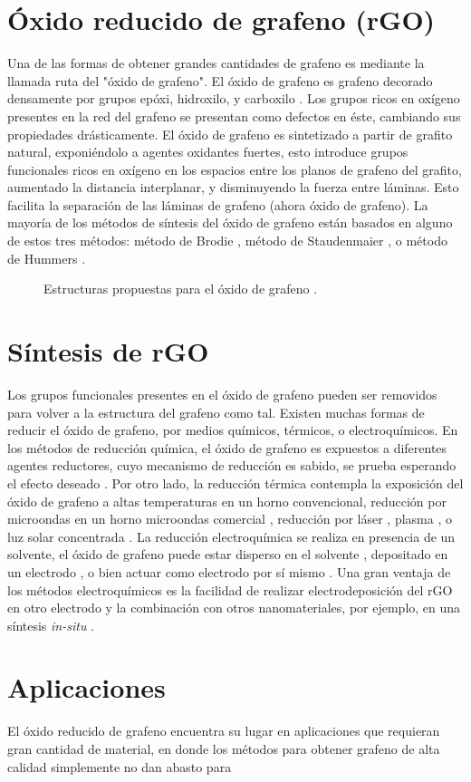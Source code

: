 \section{Óxido reducido de grafeno (rGO)}
Una de las formas de obtener grandes cantidades de grafeno es mediante la llamada ruta del "óxido de grafeno". El óxido de grafeno es grafeno decorado densamente por grupos epóxi, hidroxilo, y carboxilo \citep{Dreyer2010}. Los grupos ricos en oxígeno presentes en la red del grafeno se presentan como defectos en éste, cambiando sus propiedades drásticamente.
El óxido de grafeno es sintetizado a partir de grafito natural, exponiéndolo a agentes oxidantes fuertes, esto introduce grupos funcionales ricos en oxígeno en los espacios entre los planos de grafeno del grafito, aumentado la distancia interplanar, y disminuyendo la fuerza entre láminas. Esto facilita la separación de las láminas de grafeno (ahora óxido de grafeno). La mayoría de los métodos de síntesis del óxido de grafeno están basados en alguno de estos tres métodos: método de Brodie \citep{Brodie1859}, método de Staudenmaier \citep{Staudenmaier1898}, o método de Hummers \citep{Hummers1958}.

\begin{figure}
	\centering
	\caption{Estructuras propuestas para el óxido de grafeno \citep{Dreyer2010}.}
	\label{fig:GO_structure}
\end{figure}


\section{Síntesis de rGO}
Los grupos funcionales presentes en el óxido de grafeno pueden ser removidos para volver a la estructura del grafeno como tal. Existen muchas formas de reducir el óxido de grafeno, por medios químicos, térmicos, o electroquímicos. En los métodos de reducción química, el óxido de grafeno es expuestos a diferentes agentes reductores, cuyo mecanismo de reducción es sabido, se prueba esperando el efecto deseado \citep{Chua2015}. Por otro lado, la reducción térmica contempla la exposición del óxido de grafeno a altas temperaturas en un horno convencional, reducción por microondas en un horno microondas comercial \citep{Zhu2010a}, reducción por láser \citep{El-Kady2013}, plasma \citep{Lee2012}, o luz solar concentrada \citep{Mohandoss2017}. La reducción electroquímica se realiza en presencia de un solvente, el óxido de grafeno puede estar disperso en el solvente \citep{Liu2011}, depositado en un electrodo \citep{Harima2011, Toh2014}, o bien actuar como electrodo por sí mismo \citep{Feng2016}. Una gran ventaja de los métodos electroquímicos es la facilidad de realizar electrodeposición del rGO en otro electrodo y la combinación con otros nanomateriales, por ejemplo, en una síntesis \emph{in-situ} \citep{Liu2011, Xie2014}.

\section{Aplicaciones}
El óxido reducido de grafeno encuentra su lugar en aplicaciones que requieran gran cantidad de material, en donde los métodos para obtener grafeno de alta calidad simplemente no dan abasto para




